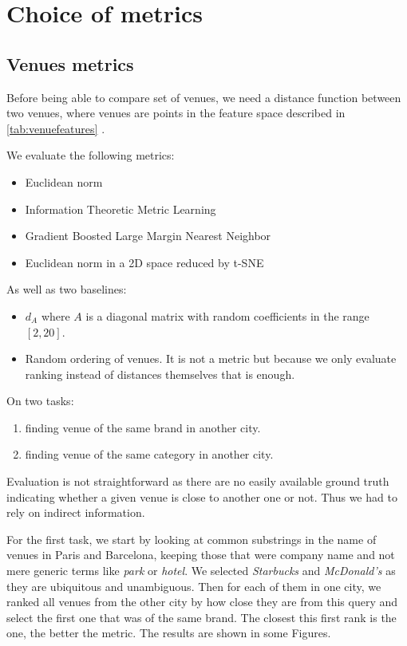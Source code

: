 \chapter{Choice of metrics}
\label{chap:metric}

\section{Venues metrics}

Before being able to compare set of venues, we need a distance function between
two venues, where venues are points in the feature space described in
\autoref{tab:venuefeatures} .

We evaluate the following metrics:
\begin{itemize}
	\item Euclidean norm
	\item Information Theoretic Metric Learning
	\item Gradient Boosted Large Margin Nearest Neighbor
	\item Euclidean norm in a 2D space reduced by t-SNE
\end{itemize}		
As well as two baselines:
\begin{itemize}
	\item $d_A$ where $A$ is a diagonal matrix with random coefficients in
		the range $[2, 20]$.
	\item Random ordering of venues. It is not a metric but because we
		only evaluate ranking instead of distances themselves that is
		enough.
\end{itemize}		
On two tasks:
\begin{enumerate}
	\item finding venue of the same brand in another city.
	\item finding venue of the same category in another city.
\end{enumerate}		

Evaluation is not straightforward as there are no easily available ground truth
indicating whether a given venue is close to another one or not. Thus we had to
rely on indirect information.

For the first task, we start by looking at common substrings in the name of venues
in Paris and Barcelona, keeping those that were company name and not mere
generic terms like \emph{park} or \emph{hotel}. We selected \emph{Starbucks} and
\emph{McDonald's} as they are ubiquitous and unambiguous. Then for each of
them in one city, we ranked all venues from the other city by how close they
are from this query and select the first one that was of the same brand. The
closest this first rank is the one, the better the metric. The results are
shown in some Figures.

